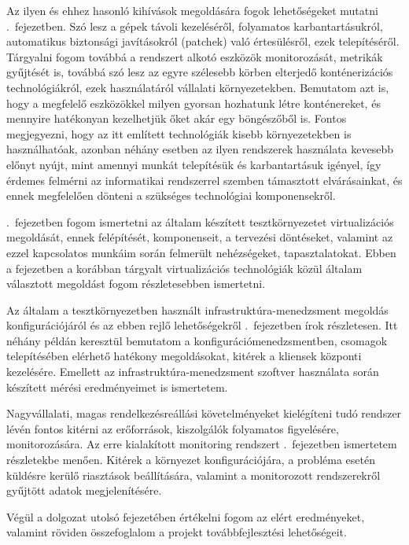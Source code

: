 Az ilyen és ehhez hasonló kihívások megoldására fogok lehetőségeket mutatni .~fejezetben. Szó lesz a gépek távoli kezeléséről, folyamatos karbantartásukról, automatikus biztonsági javításokról (patchek) való értesülésről, ezek telepítéséről. Tárgyalni fogom továbbá a rendszert alkotó eszközök monitorozását, metrikák gyűjtését is, továbbá szó lesz az egyre szélesebb körben elterjedő konténerizációs technológiákról, ezek használatáról vállalati környezetekben. Bemutatom azt is, hogy a megfelelő eszközökkel milyen gyorsan hozhatunk létre konténereket, és mennyire hatékonyan kezelhetjük őket akár egy böngészőből is.
Fontos megjegyezni, hogy az itt említett technológiák kisebb környezetekben is használhatóak, azonban néhány esetben az ilyen rendszerek használata kevesebb előnyt nyújt, mint amennyi munkát telepítésük és karbantartásuk igényel, így érdemes felmérni az informatikai rendszerrel szemben támasztott elvárásainkat, és ennek megfelelően dönteni a szükséges technológiai komponensekről.

.~fejezetben fogom ismertetni az általam készített tesztkörnyezetet virtualizációs megoldását, ennek felépítését, komponenseit, a tervezési döntéseket, valamint az ezzel kapcsolatos munkáim során felmerült nehézségeket, tapasztalatokat. Ebben a fejezetben a korábban tárgyalt virtualizációs technológiák közül általam választott megoldást fogom részletesebben ismertetni.

Az általam a tesztkörnyezetben használt infrastruktúra-menedzsment megoldás konfigurációjáról és az ebben rejlő lehetőségekről .~fejezetben írok részletesen. Itt néhány példán keresztül bemutatom a konfigurációmenedzsmentben, csomagok telepítésében elérhető hatékony megoldásokat, kitérek a kliensek központi kezelésére. Emellett az infrastruktúra-menedzsment szoftver használata során készített mérési eredményeimet is ismertetem.

Nagyvállalati, magas rendelkezésreállási követelményeket kielégíteni tudó rendszer lévén fontos kitérni az erőforrások, kiszolgálók folyamatos figyelésére, monitorozására. Az erre kialakított monitoring rendszert .~fejezetben ismertetem részletekbe menően. Kitérek a környezet konfigurációjára, a probléma esetén küldésre kerülő riasztások beállítására, valamint a monitorozott rendszerekről gyűjtött adatok megjelenítésére.

Végül a dolgozat utolsó fejezetében értékelni fogom az elért eredményeket, valamint röviden összefoglalom a projekt továbbfejlesztési lehetőségeit.


